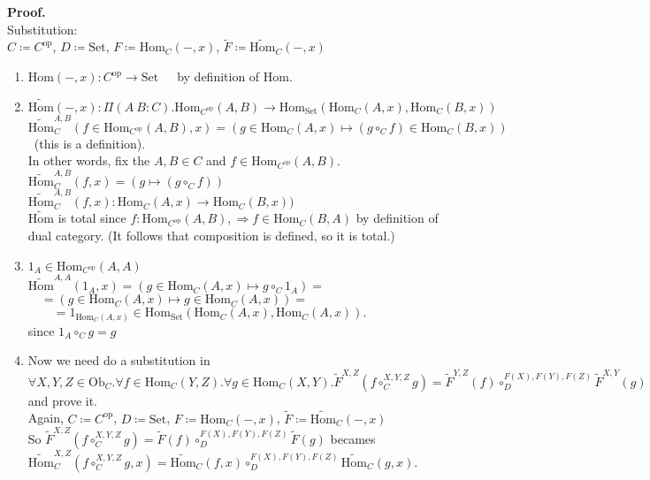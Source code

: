 \documentclass[10pt,a4paper]{article}
\theoremstyle{definition}
\newcommand{\Ob}{{\mbox{Ob}}}
\newcommand{\Hom}{{\mbox{Hom}}}
\newcommand{\HomMor}{{\widetilde{\Hom}\mbox{}}}
\newcommand{\FMor}{{\widetilde{F}\mbox{}}}
\newcommand{\op}{{\mbox{op}}}
\newcommand{\Set}{{\mbox{Set}}}
\newcommand{\myprf}{\noindent\textbf{Proof.}}
\begin{document}
\myprf\\
Substitution:\\
$C \coloneqq C^\op$, 
$D \coloneqq \Set$, 
$F \coloneqq \Hom_C(-,x)$, 
$\FMor \coloneqq \HomMor_C(-,x)$\\
\begin{enumerate}
\item $\Hom(-, x) : C^\op \to \Set$\ \ \ by definition of $\Hom$.
\item $\HomMor(-, x) :\Pi(A\ B:C).\Hom_{C^\op}(A,B) \to \Hom_\Set(\Hom_C(A,x), \Hom_C(B,x))$\\
$\HomMor_C^{A,B}(f\in\Hom_{C^\op}(A,B), x) = (g \in\Hom_C(A,x) \mapsto (g \circ_C f) \in\Hom_C(B,x))$\ (this is a definition).\\
In other words, fix the $A,B\in C$ and $f\in\Hom_{C^\op}(A,B)$.\\
$\HomMor_C^{A,B}(f, x) = (g\mapsto (g \circ_C f))$\\
$\HomMor_C^{A,B}(f, x) : \Hom_C(A,x) \to \Hom_C(B,x))$
\\
$\HomMor$ is total since $f:\Hom_{C^\op}(A,B), \Rightarrow f\in\Hom_C(B,A)$ by definition of dual category. (It follows that composition is defined, so it is total.)
\item $1_A\in\Hom_{C^\op}(A,A)$\\
$\HomMor^{A,A}(1_A, x) = \left(g \in\Hom_C(A,x)\mapsto g \circ_C 1_A\right) = $\\
$\quad = \left(g \in\Hom_C(A,x) \mapsto g \in\Hom_C(A,x)\right) =$\\
$\quad \quad = 1_{\Hom_C(A,x)} \in \Hom_\Set\left(\Hom_C(A,x), \Hom_C(A,x)\right).$\\
since $1_A \circ_C g = g$\\
\item Now we need do a substitution in
$\forall X,Y,Z \in \Ob_C.\forall f\in\Hom_C(Y,Z).\forall g\in\Hom_C(X,Y). \FMor^{X,Z}(f\circ_C^{X,Y,Z} g)=\FMor^{Y,Z}(f)\circ_D^{F(X),F(Y),F(Z)} \FMor^{X,Y}(g)$ and prove it.\\
Again, $C \coloneqq C^\op$, 
$D \coloneqq \Set$, 
$F \coloneqq \Hom_C(-,x)$, 
$\FMor \coloneqq \HomMor_C(-,x)$\\
So $\FMor^{X,Z}(f\circ_C^{X,Y,Z} g)=\FMor(f)\circ_D^{F(X),F(Y),F(Z)} \FMor(g)$ becames\\
$\HomMor_C^{X,Z}(f\circ_C^{X,Y,Z} g, x)=\HomMor_C(f,x)\circ_D^{F(X),F(Y),F(Z)} \HomMor_C(g,x)$.\\

\end{enumerate}
\end{document}
